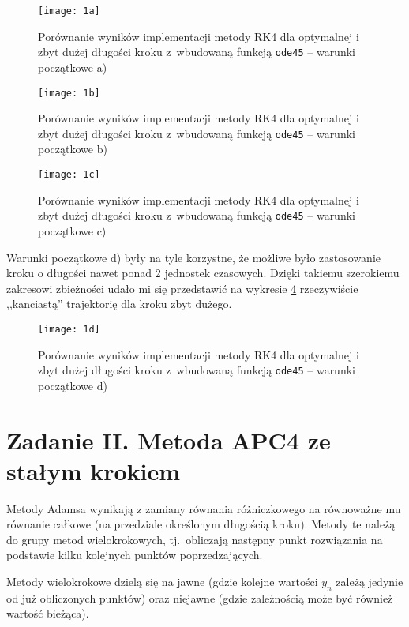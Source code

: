\documentclass[12pt]{article}
\begin{document}
\begin{figure}[!htbp]
\centering
\texttt{[image: 1a]}
\centering
\caption{Porównanie wyników implementacji metody RK4 dla optymalnej i zbyt dużej długości kroku z~wbudowaną funkcją \texttt{ode45} -- warunki początkowe a)}
\label{fig:1a}
\end{figure}
\FloatBarrier

\begin{figure}[!htbp]
\centering
\texttt{[image: 1b]}
\centering
\caption{Porównanie wyników implementacji metody RK4 dla optymalnej i zbyt dużej długości kroku z~wbudowaną funkcją \texttt{ode45} -- warunki początkowe b)}
\label{fig:1b}
\end{figure}
\FloatBarrier

\begin{figure}[!htbp]
\centering
\texttt{[image: 1c]}
\centering
\caption{Porównanie wyników implementacji metody RK4 dla optymalnej i zbyt dużej długości kroku z~wbudowaną funkcją \texttt{ode45} -- warunki początkowe c)}
\label{fig:1c}
\end{figure}
\FloatBarrier

Warunki początkowe d) były na tyle korzystne, że możliwe było zastosowanie kroku o długości nawet ponad 2 jednostek czasowych. Dzięki takiemu szerokiemu zakresowi zbieżności udało mi się przedstawić na wykresie \ref{fig:1d} rzeczywiście ,,kanciastą'' trajektorię dla kroku zbyt dużego.

\begin{figure}[!htbp]
\centering
\texttt{[image: 1d]}
\centering
\caption{Porównanie wyników implementacji metody RK4 dla optymalnej i zbyt dużej długości kroku z~wbudowaną funkcją \texttt{ode45} -- warunki początkowe d)}
\label{fig:1d}
\end{figure}
\FloatBarrier

\section{Zadanie \textrm{II}. Metoda APC4 ze stałym krokiem}
Metody Adamsa wynikają z zamiany równania różniczkowego na równoważne mu równanie całkowe (na przedziale określonym długością kroku). Metody te należą do grupy metod wielokrokowych, tj.~obliczają następny punkt rozwiązania na podstawie kilku kolejnych punktów poprzedzających.

Metody wielokrokowe dzielą się na jawne (gdzie kolejne wartości \( y_n \) zależą jedynie od już obliczonych punktów) oraz niejawne (gdzie zależnością może być również wartość bieżąca).
\end{document}

